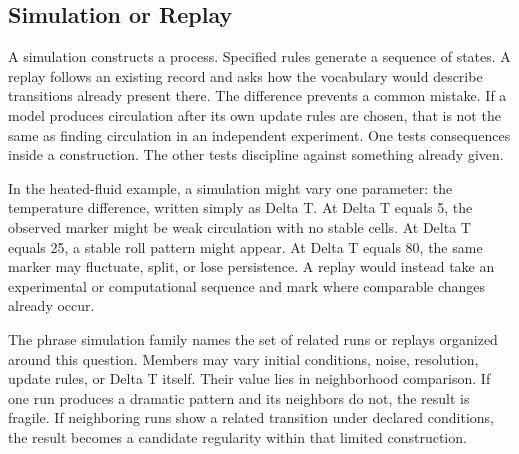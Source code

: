 \documentclass[11pt,a4paper,openany]{book}
\begin{document}
\subsection{Simulation or Replay}
A simulation constructs a process. Specified rules generate a sequence of states. A replay follows an existing record and asks how the vocabulary would describe transitions already present there. The difference prevents a common mistake. If a model produces circulation after its own update rules are chosen, that is not the same as finding circulation in an independent experiment. One tests consequences inside a construction. The other tests discipline against something already given. \cite{landau_stat_physics,prigogine_dissipative}\par
In the heated-fluid example, a simulation might vary one parameter: the temperature difference, written simply as Delta T. At Delta T equals 5, the observed marker might be weak circulation with no stable cells. At Delta T equals 25, a stable roll pattern might appear. At Delta T equals 80, the same marker may fluctuate, split, or lose persistence. A replay would instead take an experimental or computational sequence and mark where comparable changes already occur.\par
The phrase simulation family names the set of related runs or replays organized around this question. Members may vary initial conditions, noise, resolution, update rules, or Delta T itself. Their value lies in neighborhood comparison. If one run produces a dramatic pattern and its neighbors do not, the result is fragile. If neighboring runs show a related transition under declared conditions, the result becomes a candidate regularity within that limited construction.\par
\end{document}

